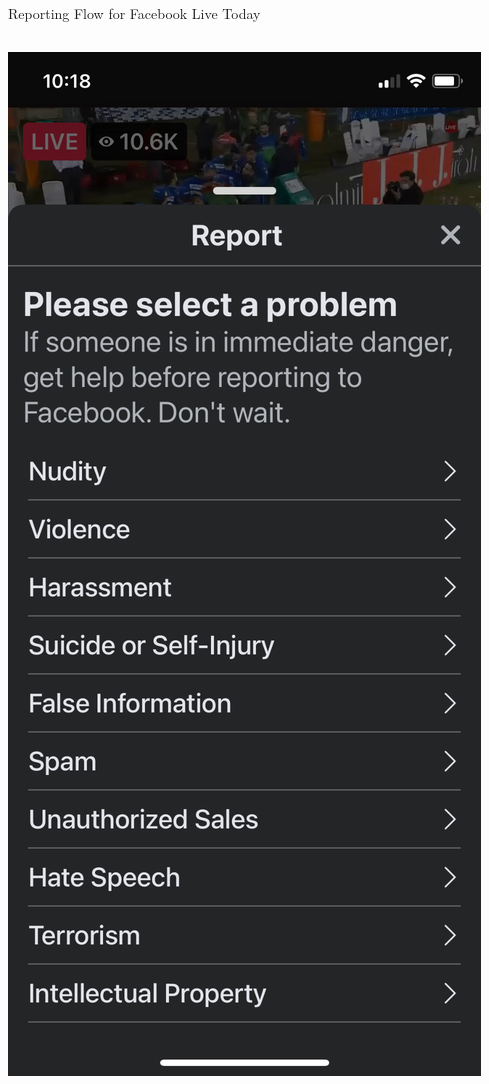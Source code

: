 \documentclass[nobackground,dvipsnames,table,aspectratio=169]{beamer}
\begin{document}
\begin{frame}{Reporting Flow for Facebook Live Today}
    \begin{columns}
            \includegraphics[width=\textwidth]{facebook-live-current-reporting-flow-1}

\end{columns}
\end{frame}
\end{document}
